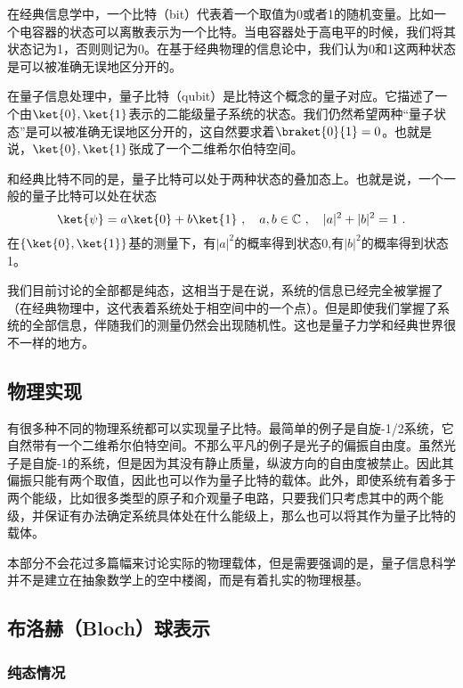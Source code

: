 

在经典信息学中，一个比特（bit）代表着一个取值为0或者1的随机变量。比如一个电容器的状态可以离散表示为一个比特。当电容器处于高电平的时候，我们将其状态记为1，否则则记为0。在基于经典物理的信息论中，我们认为0和1这两种状态是可以被准确无误地区分开的。

在量子信息处理中，量子比特（qubit）是比特这个概念的量子对应。它描述了一个由$\ket{0},\ket{1}$表示的二能级量子系统的状态。我们仍然希望两种“量子状态”是可以被准确无误地区分开的，这自然要求着$\braket{0}{1}=0$。也就是说，$\ket{0},\ket{1}$张成了一个二维希尔伯特空间。

和经典比特不同的是，量子比特可以处于两种状态的叠加态上。也就是说，一个一般的量子比特可以处在状态
\begin{equation}
\ket{\psi}=a\ket{0}+b\ket{1}~,\quad a,b\in\mathbb{C}~,\quad |a|^2+|b|^2=1~.
\end{equation}
在$\{\ket{0},\ket{1}\}$基的测量下，有$|a|^2$的概率得到状态0,有$|b|^2$的概率得到状态1。

我们目前讨论的全部都是纯态，这相当于是在说，系统的信息已经完全被掌握了（在经典物理中，这代表着系统处于相空间中的一个点）。但是即使我们掌握了系统的全部信息，伴随我们的测量仍然会出现随机性。这也是量子力学和经典世界很不一样的地方。



\subsection{物理实现}

有很多种不同的物理系统都可以实现量子比特。最简单的例子是自旋-1/2系统，它自然带有一个二维希尔伯特空间。不那么平凡的例子是光子的偏振自由度。虽然光子是自旋-1的系统，但是因为其没有静止质量，纵波方向的自由度被禁止。因此其偏振只能有两个取值，因此也可以作为量子比特的载体。此外，即使系统有着多于两个能级，比如很多类型的原子和介观量子电路，只要我们只考虑其中的两个能级，并保证有办法确定系统具体处在什么能级上，那么也可以将其作为量子比特的载体。

本部分不会花过多篇幅来讨论实际的物理载体，但是需要强调的是，量子信息科学并不是建立在抽象数学上的空中楼阁，而是有着扎实的物理根基。

\subsection{布洛赫（Bloch）球表示}

\subsubsection{纯态情况}

